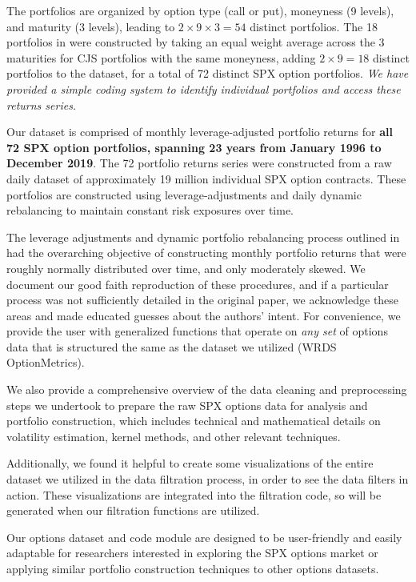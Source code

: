 \documentclass{article}
\begin{document}
The \citet{Constantinides2013} portfolios are organized by option type (call or put), moneyness (9 levels), and maturity (3 levels), leading to $2 \times 9 \times 3 = 54$ distinct portfolios. The 18 portfolios in \citet{He2017} were constructed by taking an equal weight average across the 3 maturities for CJS portfolios with the same moneyness, adding $2 \times 9 = 18$ distinct portfolios to the dataset, for a total of 72 distinct SPX option portfolios. \emph{We have provided a simple coding system to identify individual portfolios and access these returns series.}

Our dataset is comprised of monthly leverage-adjusted portfolio returns for \textbf{all 72 SPX option portfolios, spanning 23 years from January 1996 to December 2019}. The 72 portfolio returns series were constructed from a raw daily dataset of approximately 19 million individual SPX option contracts. These portfolios are constructed using leverage-adjustments and daily dynamic rebalancing to maintain constant risk exposures over time.


The leverage adjustments and dynamic portfolio rebalancing process outlined in \citet{Constantinides2013} had the overarching objective of constructing monthly portfolio returns that were roughly normally distributed over time, and only moderately skewed. We document our good faith reproduction of these procedures, and if a particular process was not sufficiently detailed in the original paper, we acknowledge these areas and made educated guesses about the authors' intent. For convenience, we provide the user with generalized functions that operate on \emph{any set} of options data that is structured the same as the dataset we utilized (WRDS OptionMetrics). 

We also provide a comprehensive overview of the data cleaning and preprocessing steps we undertook to prepare the raw SPX options data for analysis and portfolio construction, which includes technical and mathematical details on volatility estimation, kernel methods, and other relevant techniques.

Additionally, we found it helpful to create some visualizations of the entire dataset we utilized in the data filtration process, in order to see the data filters in action. These visualizations are integrated into the filtration code, so will be generated when our filtration functions are utilized.

Our options dataset and code module are designed to be user-friendly and easily adaptable for researchers interested in exploring the SPX options market or applying similar portfolio construction techniques to other options datasets. 
\end{document}
